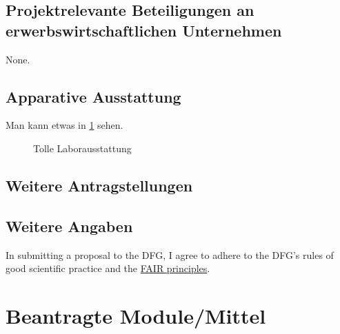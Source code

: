 \documentclass[ngerman]{scrartcl}
\begin{document}
\subsection{Projektrelevante Beteiligungen an erwerbswirtschaftlichen Unternehmen}
None.

\subsection{Apparative Ausstattung}
Man kann etwas in \cref{fig:some_nice_graph} sehen.
\begin{figure}
\centering
{}
\caption{Tolle Laborausstattung}
\label{fig:some_nice_graph}
\end{figure}

\subsection{Weitere Antragstellungen}

\subsection{Weitere Angaben}
In submitting a proposal to the DFG, I agree to adhere to the DFG's rules of good scientific practice and the \href{https://www.nature.com/articles/sdata201618}{FAIR principles}.


\section{Beantragte Module/Mittel}
\end{document}
